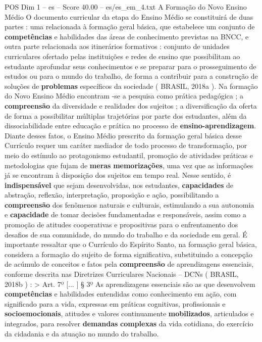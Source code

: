 \begin{textsample}{POS Dim 1 – es – Score 40.00 – es/es\_em\_4.txt}  \label{ex:f1_pos_198}
A Formação do Novo Ensino Médio O documento curricular da etapa do Ensino Médio se constituirá de duas partes : uma relacionada à formação geral básica, que estabelece um conjunto de \textbf{competências} e habilidades das áreas de conhecimento previstas na BNCC, e outra parte relacionada aos itinerários formativos : conjunto de unidades curriculares ofertado pelas instituições e redes de ensino que possibilitam ao estudante aprofundar seus conhecimentos e se preparar para o prosseguimento de estudos ou para o mundo do trabalho, de forma a contribuir para a construção de soluções de \textbf{problemas} específicos da sociedade ( BRASIL, 2018a ).
Na formação do Novo Ensino Médio encontram -se a pesquisa como prática pedagógica ; a \textbf{compreensão} da diversidade e realidades dos sujeitos ; a diversificação da oferta de forma a possibilitar múltiplas trajetórias por parte dos estudantes, além da dissociabilidade entre educação e prática no processo de \textbf{ensino-aprendizagem}.
Diante desses fatos, o Ensino Médio prescrito da formação geral básica desse Currículo requer um caráter mediador de todo processo de transformação, por meio do estímulo ao protagonismo estudantil, promoção de atividades práticas e metodologias que fujam de \textbf{meras} \textbf{memorizações}, uma vez que as informações já se encontram à disposição dos sujeitos em tempo real.
Nesse sentido, é \textbf{indispensável} que sejam desenvolvidas, nos estudantes, \textbf{capacidades} de abstração, reflexão, interpretação, proposição e ação, possibilitando a \textbf{compreensão} dos fenômenos naturais e culturais, estimulando a sua autonomia e \textbf{capacidade} de tomar decisões fundamentadas e responsáveis, assim como a promoção de atitudes cooperativas e propositivas para o enfrentamento dos desafios de sua comunidade, do mundo do trabalho e da sociedade em geral.
É importante ressaltar que o Currículo do Espírito Santo, na formação geral básica, considera a formação do sujeito de forma significativa, substituindo a concepção de acúmulo de conceitos e fatos pela \textbf{compreensão} de aprendizagens essenciais, conforme descrita nas Diretrizes Curriculares Nacionais – DCNs ( BRASIL, 2018b ) : > Art. 7º [... ] § 3º As aprendizagens essenciais são as que desenvolvem \textbf{competências} e habilidades entendidas como conhecimento em ação, com significado para a vida, expressas em práticas cognitivas, profissionais e \textbf{socioemocionais}, atitudes e valores continuamente \textbf{mobilizados}, articulados e integrados, para resolver \textbf{demandas} \textbf{complexas} da vida cotidiana, do exercício da cidadania e da atuação no mundo do trabalho.

\end{textsample}
